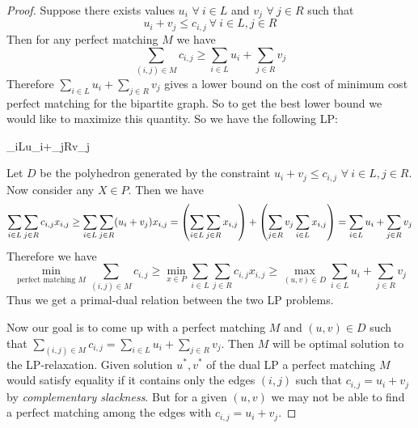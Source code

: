 \documentclass[twoside]{article}
\begin{document}
\begin{proof}
	Suppose there exists values $u_i$ $\forall\ i\in L$ and $v_j$ $\forall\ j\in R$ such that $$u_i+v_j\leq c_{i,j}\ \forall\ i\in L, j\in R$$Then for any perfect matching $M$ we have $$\sum_{(i,j)\in M}c_{i,j}\geq \sum_{i\in L}u_i+\sum_{j\in R}v_j$$Therefore $\sum\limits_{i\in L}u_i+\sum\limits_{j\in R}v_j$ gives a lower bound on the cost of minimum cost perfect matching for the bipartite graph. So to get the best lower bound we would like to maximize this quantity. So we have the following LP:
	\begin{maxi*}{}{\sum_{i\in L}u_i+\sum_{j\in R}v_j}{}{}
	\end{maxi*}Let $D$ be the polyhedron generated by the constraint $u_i+v_j\leq c_{i,j}$ $\forall\ i\in L,j\in R$. Now consider any $X\in P$. Then we have $$\sum_{i\in L}\sum_{j\in R}c_{i,j}x_{i,j}\geq \sum_{i\in L}\sum_{j\in R}(u_i+v_j)x_{i,j}=\left(\sum_{i\in L}\sum_{j\in R}x_{i,j}\right)+\left(\sum_{j\in R}v_j\sum_{i\in L}x_{i,j}\right)=\sum_{i\in L}u_i+\sum_{j\in R}v_j$$Therefore we have $$\min\limits_{\text{perfect matching $M$}}\sum_{(i,j)\in M}c_{i,j}\geq \min\limits_{x\in P}\sum_{i\in L}\sum_{j\in R}c_{i,j}x_{i,j}\geq \max\limits_{(u,v)\in D}\sum_{i\in L}u_i+\sum_{j\in R}v_j$$Thus we get a primal-dual relation between the two LP problems.
	
	Now our goal is to come up with a perfect matching $M$ and $(u,v)\in D$ such that $\sum\limits_{(i,j)\in M}c_{i,j}=\sum\limits_{i\in L}u_i+\sum\limits_{j\in R}v_j$. Then $M$ will be optimal solution to the LP-relaxation. Given solution $u^*,v^*$ of the dual LP a perfect matching $M$ would satisfy equality if it contains only the edges $(i,j)$ such that $c_{i,j}=u_i+v_j$ by \textit{complementary slackness}. But for a given $(u,v)$ we may not be able to find a perfect matching among the edges with $c_{i,j}=u_i+v_j$. 
	

\end{proof}
\end{document}
